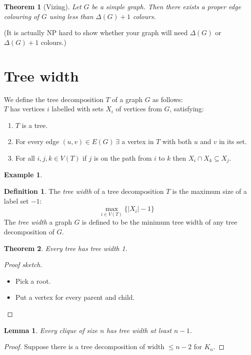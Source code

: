 \documentclass{article}
\newtheorem*{thm}{Theorem}
\newtheorem*{lem}{Lemma}
\theoremstyle{definition}
\newtheorem*{defn}{Definition}
\newtheorem*{ex}{Example}
\begin{document}
\begin{thm}[Vizing]
Let $G$ be a simple graph.
Then there exists a proper edge colouring of $G$ using less than $\Delta(G) + 1$ colours.
\end{thm}

(It is actually NP hard to show whether your graph will need $\Delta(G)$ or $\Delta(G) + 1$ colours.)



\section{Tree width}

We define the tree decomposition $T$ of a graph $G$ as follows: \\
$T$ has vertices $i$ labelled with sets $X_i$ of vertices from $G$, satisfying:
\begin{enumerate}
\item $T$ is a tree.
\item For every edge $(u,v)\in E(G)\ \exists$ a vertex in $T$ with both $u$ and $v$ in its set.
\item For all $i,j,k\in V(T)$ if $j$ is on the path from $i$ to $k$ then $X_i\cap X_k\subseteq X_j$.
\end{enumerate}

\begin{ex}
\end{ex}

\begin{defn}
The \emph{tree width} of a tree decomposition $T$ is the maximum size of a label set $- 1$:
$$\max_{i\in V(T)} \{|X_i| -1\}$$
The \emph{tree width} a graph $G$ is defined to be the minimum tree width of any tree decomposition of $G$.
\end{defn}

\begin{thm}
Every tree has tree width 1.
\end{thm}

\begin{proof}[Proof sketch]
\begin{itemize}
\item Pick a root.
\item Put a vertex for every parent and child.
\end{itemize}
\end{proof}

\begin{lem}
Every clique of size $n$ has tree width at least $n-1$.
\end{lem}

\begin{proof}
Suppose there is a tree decomposition of width $\le n-2$ for $K_n$.
\end{proof}
\end{document}
